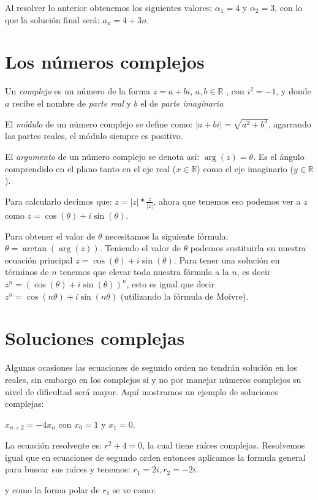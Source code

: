 \documentclass{report}
\begin{document}
Al resolver lo anterior obtenemos los siguientes valores:
$\alpha_{1}=4$ y $\alpha_{2}=3$, con lo que la solución final será:
$a_{n}=4+3n$.


\section{Los números  complejos}

Un \textit{complejo} es un número de la forma $z=a+bi$, $a,b\in\mathbb{R}$ ,
con $i^2=-1$, y donde $a$ recibe el nombre de \textit{parte real} y $b$ el de
\textit{parte imaginaria}

El \textit{módulo} de un número complejo se define como:
$|a+bi|=\sqrt{a^2+b^2}$, agarrando las partes reales, el módulo
siempre es positivo.

El \textit{argumento} de un número complejo se denota así: $\arg(z)=\theta$. Es
el ángulo comprendido en el plano tanto en el eje real
($x\in\mathbb{R}$) como el eje imaginario ($y\in\mathbb{R}$).

Para calcularlo decimos que:
$z=|z|*\frac{z}{|z|}$, ahora que tenemos eso podemos ver a $z$ como
$z=\cos(\theta)+i\sin(\theta)$.

Para obtener el valor de $\theta$
necesitamos la siguiente fórmula: $\theta=\arctan(\arg(z))$. Teniendo el
valor de $\theta$ podemos sustituirla en nuestra ecuación principal
$z=\cos(\theta)+i\sin(\theta)$. Para tener una solución en términos de
$n$ tenemos que elevar toda nuestra fórmula a la $n$, es decir
$z^n=(\cos(\theta)+i\sin(\theta))^n$, esto es igual que decir
$z^n=\cos(n\theta)+i\sin(n\theta)$ (utilizando la fórmula de Moivre).

\section{Soluciones complejas}
\label{sec:complejas}

Algunas ocasiones las ecuaciones de segundo orden no tendrán solución
en los reales, sin embargo en los complejos sí y no por manejar
números complejos su nivel de dificultad será mayor. Aquí mostramos un
ejemplo de soluciones complejas: 

$x_{n+2}=-4x_{n}$ con $x_0=1$ y $x_1=0$.

La ecuación resolvente es: $r^2+4=0$, la cual tiene raíces complejas.
Resolvemos igual que en ecuaciones de segundo orden entonces aplicamos
la formula general para buscar sus raíces y tenemos: $r_1=2i,r_2=-2i$.

y como la forma polar de $r_1$
se ve como:
\end{document}
